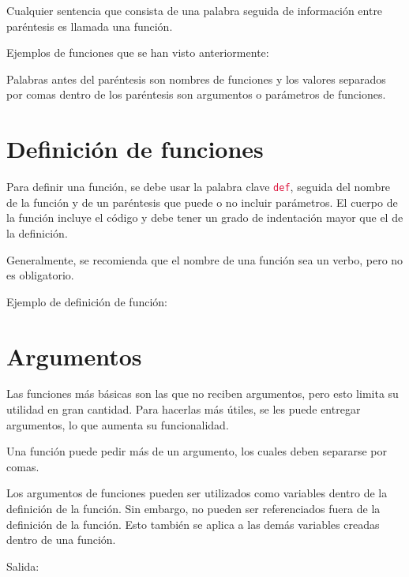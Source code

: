 \documentclass{report}
\newcommand{\out}[1]{Salida:\outfile{#1}}
\newcommand{\ttt}[1]{\textcolor{Crimson}{\texttt{#1}}}
\begin{document}
Cualquier sentencia que consista de una palabra seguida de información entre paréntesis es llamada una función.\smallskip

Ejemplos de funciones que se han visto anteriormente:


Palabras antes del paréntesis son nombres de funciones y los valores separados por comas dentro de los paréntesis son argumentos o parámetros de funciones.

\section{Definición de funciones}

Para definir una función, se debe usar la palabra clave \ttt{def}, seguida del nombre de la función y de un paréntesis que puede o no incluir parámetros. El cuerpo de la función incluye el código y debe tener un grado de indentación mayor que el de la definición.\smallskip

Generalmente, se recomienda que el nombre de una función sea un verbo, pero no es obligatorio.\smallskip

Ejemplo de definición de función:


\section{Argumentos}

Las funciones más básicas son las que no reciben argumentos, pero esto limita su utilidad en gran cantidad. Para hacerlas más útiles, se les puede entregar argumentos, lo que aumenta su funcionalidad.


Una función puede pedir más de un argumento, los cuales deben separarse por comas.



Los argumentos de funciones pueden ser utilizados como variables dentro de la definición de la función. Sin embargo, no pueden ser referenciados fuera de la definición de la función. Esto también se aplica a las demás variables creadas dentro de una función.

\out{codigo/8-funciones/argumentos.out}
\end{document}
